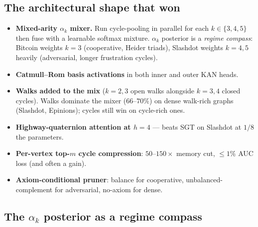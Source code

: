 \documentclass[11pt,a4paper]{article}
\begin{document}
\subsection{The architectural shape that won}

\begin{itemize}
  \item \textbf{Mixed-arity $\alpha_k$ mixer.} Run cycle-pooling in parallel
        for each $k \in \{3, 4, 5\}$ then fuse with a learnable softmax mixture.
        $\alpha_k$ posterior is a \emph{regime compass}: Bitcoin weights $k=3$
        (cooperative, Heider triads), Slashdot weights $k=4, 5$ heavily
        (adversarial, longer frustration cycles).
  \item \textbf{Catmull--Rom basis activations} in both inner and outer KAN heads.
  \item \textbf{Walks added to the mix} ($k{=}2, 3$ open walks alongside $k{=}3, 4$
        closed cycles). Walks dominate the mixer ($66$--$70\%$) on dense
        walk-rich graphs (Slashdot, Epinions); cycles still win on
        cycle-rich ones.
  \item \textbf{Highway-quaternion attention at $h{=}4$} --- beats SGT on
        Slashdot at $1/8$ the parameters.
  \item \textbf{Per-vertex top-$m$ cycle compression}: $50$--$150\times$
        memory cut, $\leq 1\%$ AUC loss (and often a gain).
  \item \textbf{Axiom-conditional pruner}: balance for cooperative,
        unbalanced-complement for adversarial, no-axiom for dense.
\end{itemize}

\subsection{The $\alpha_k$ posterior as a regime compass}
\end{document}
